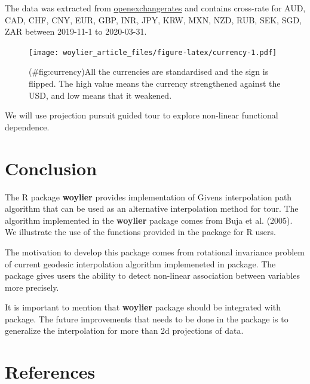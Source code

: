 The data was extracted from \href{https://openexchangerates.org}{openexchangerates} and contains cross-rate for AUD, CAD, CHF, CNY, EUR, GBP, INR, JPY, KRW, MXN, NZD, RUB, SEK, SGD, ZAR between 2019-11-1 to 2020-03-31.

\begin{figure}
\centering
\texttt{[image: woylier\_article\_files/figure-latex/currency-1.pdf]}
\caption{(\#fig:currency)All the currencies are standardised and the sign is flipped. The high value means the currency strengthened against the USD, and low means that it weakened.}
\end{figure}

We will use projection pursuit guided tour to explore non-linear functional dependence.

\hypertarget{conclusion}{%
\section{Conclusion}\label{conclusion}}

The R package \textbf{woylier} provides implementation of Givens interpolation path algorithm that can be used as an alternative interpolation method for tour. The algorithm implemented in the \textbf{woylier} package comes from Buja et al. (2005). We illustrate the use of the functions provided in the package for R users.

The motivation to develop this package comes from rotational invariance problem of current geodesic interpolation algorithm implemeneted in  package. The package gives users the ability to detect non-linear association between variables more precisely.

It is important to mention that \textbf{woylier} package should be integrated with  package. The future improvements that needs to be done in the package is to generalize the interpolation for more than 2d projections of data.

\hypertarget{references}{%
\section*{References}\label{references}}

